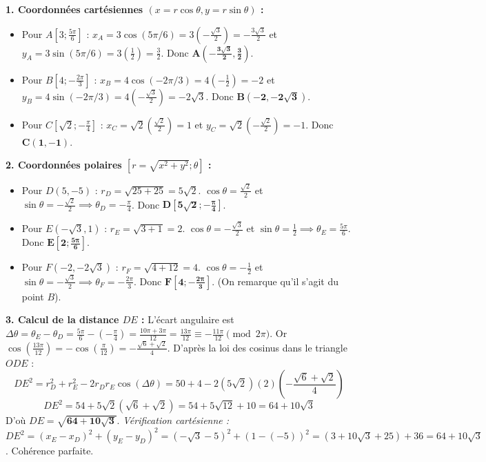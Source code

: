 \documentclass[11pt,a4paper]{article}
\begin{document}
\begin{correctionbox}
\textbf{1. Coordonnées cartésiennes $(x = r\cos\theta, y = r\sin\theta)$ :}
\begin{itemize}[label=$\bullet$]
    \item Pour $A\left[3; \frac{5\pi}{6}\right]$ :
    $x_A = 3\cos(5\pi/6) = 3\left(-\frac{\sqrt{3}}{2}\right) = -\frac{3\sqrt{3}}{2}$ et $y_A = 3\sin(5\pi/6) = 3\left(\frac{1}{2}\right) = \frac{3}{2}$.
    Donc $\mathbf{A\left(-\frac{3\sqrt{3}}{2}, \frac{3}{2}\right)}$.
    \item Pour $B\left[4; -\frac{2\pi}{3}\right]$ :
    $x_B = 4\cos(-2\pi/3) = 4\left(-\frac{1}{2}\right) = -2$ et $y_B = 4\sin(-2\pi/3) = 4\left(-\frac{\sqrt{3}}{2}\right) = -2\sqrt{3}$.
    Donc $\mathbf{B(-2, -2\sqrt{3})}$.
    \item Pour $C\left[\sqrt{2}; -\frac{\pi}{4}\right]$ :
    $x_C = \sqrt{2}\left(\frac{\sqrt{2}}{2}\right) = 1$ et $y_C = \sqrt{2}\left(-\frac{\sqrt{2}}{2}\right) = -1$.
    Donc $\mathbf{C(1, -1)}$.
\end{itemize}

\textbf{2. Coordonnées polaires $[r = \sqrt{x^2+y^2}; \theta]$ :}
\begin{itemize}[label=$\bullet$]
    \item Pour $D(5, -5)$ : $r_D = \sqrt{25 + 25} = 5\sqrt{2}$. $\cos\theta = \frac{\sqrt{2}}{2}$ et $\sin\theta = -\frac{\sqrt{2}}{2} \implies \theta_D = -\frac{\pi}{4}$.
    Donc $\mathbf{D\left[5\sqrt{2}; -\frac{\pi}{4}\right]}$.
    \item Pour $E(-\sqrt{3}, 1)$ : $r_E = \sqrt{3 + 1} = 2$. $\cos\theta = -\frac{\sqrt{3}}{2}$ et $\sin\theta = \frac{1}{2} \implies \theta_E = \frac{5\pi}{6}$.
    Donc $\mathbf{E\left[2; \frac{5\pi}{6}\right]}$.
    \item Pour $F(-2, -2\sqrt{3})$ : $r_F = \sqrt{4 + 12} = 4$. $\cos\theta = -\frac{1}{2}$ et $\sin\theta = -\frac{\sqrt{3}}{2} \implies \theta_F = -\frac{2\pi}{3}$.
    Donc $\mathbf{F\left[4; -\frac{2\pi}{3}\right]}$. (On remarque qu'il s'agit du point $B$).
\end{itemize}

\textbf{3. Calcul de la distance $DE$ :}
L'écart angulaire est $\Delta\theta = \theta_E - \theta_D = \frac{5\pi}{6} - \left(-\frac{\pi}{4}\right) = \frac{10\pi + 3\pi}{12} = \frac{13\pi}{12} \equiv -\frac{11\pi}{12} \pmod{2\pi}$.
Or $\cos\left(\frac{13\pi}{12}\right) = -\cos\left(\frac{\pi}{12}\right) = -\frac{\sqrt{6}+\sqrt{2}}{4}$.
D'après la loi des cosinus dans le triangle $ODE$ :
\[
DE^2 = r_D^2 + r_E^2 - 2 r_D r_E \cos(\Delta\theta) = 50 + 4 - 2(5\sqrt{2})(2)\left(-\frac{\sqrt{6}+\sqrt{2}}{4}\right)
\]
\[
DE^2 = 54 + 5\sqrt{2}(\sqrt{6}+\sqrt{2}) = 54 + 5\sqrt{12} + 10 = 64 + 10\sqrt{3}
\]
D'où $DE = \mathbf{\sqrt{64 + 10\sqrt{3}}}$.
\emph{Vérification cartésienne :}
$DE^2 = (x_E - x_D)^2 + (y_E - y_D)^2 = (-\sqrt{3} - 5)^2 + (1 - (-5))^2 = (3 + 10\sqrt{3} + 25) + 36 = 64 + 10\sqrt{3}$. Cohérence parfaite.
\end{correctionbox}
\end{document}
